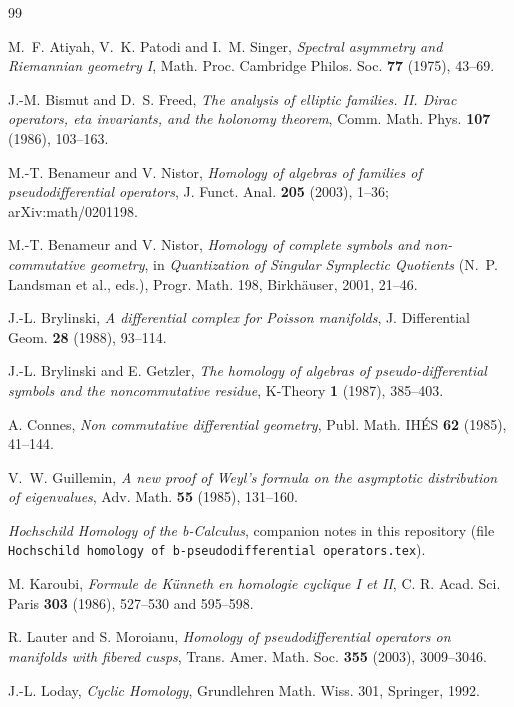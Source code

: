 \documentclass[11pt,oneside,reqno]{article}
\theoremstyle{plain}
\theoremstyle{definition}
\theoremstyle{remark}
\begin{document}
\begin{thebibliography}{99}

M.~F. Atiyah, V.~K. Patodi and I.~M. Singer,
\emph{Spectral asymmetry and Riemannian geometry I},
Math. Proc. Cambridge Philos. Soc. \textbf{77} (1975), 43--69.

J.-M. Bismut and D.~S. Freed,
\emph{The analysis of elliptic families. II. Dirac operators, eta
invariants, and the holonomy theorem},
Comm. Math. Phys. \textbf{107} (1986), 103--163.

M.-T. Benameur and V. Nistor,
\emph{Homology of algebras of families of pseudodifferential operators},
J. Funct. Anal. \textbf{205} (2003), 1--36; arXiv:math/0201198.

M.-T. Benameur and V. Nistor,
\emph{Homology of complete symbols and non-commutative geometry}, in
\emph{Quantization of Singular Symplectic Quotients} (N.~P. Landsman et
al., eds.), Progr. Math. 198, Birkh\"auser, 2001, 21--46.

J.-L. Brylinski,
\emph{A differential complex for Poisson manifolds},
J. Differential Geom. \textbf{28} (1988), 93--114.

J.-L. Brylinski and E. Getzler,
\emph{The homology of algebras of pseudo-differential symbols and the
noncommutative residue},
K-Theory \textbf{1} (1987), 385--403.

A. Connes,
\emph{Non commutative differential geometry},
Publ. Math. IH\'ES \textbf{62} (1985), 41--144.

V.~W. Guillemin,
\emph{A new proof of Weyl's formula on the asymptotic distribution of
eigenvalues},
Adv. Math. \textbf{55} (1985), 131--160.

\emph{Hochschild Homology of the b-Calculus}, companion notes in this
repository (file \texttt{Hochschild homology of b-pseudodifferential
operators.tex}).

M. Karoubi,
\emph{Formule de K\"unneth en homologie cyclique I et II},
C. R. Acad. Sci. Paris \textbf{303} (1986), 527--530 and 595--598.

R. Lauter and S. Moroianu,
\emph{Homology of pseudodifferential operators on manifolds with fibered
cusps},
Trans. Amer. Math. Soc. \textbf{355} (2003), 3009--3046.

J.-L. Loday,
\emph{Cyclic Homology},
Grundlehren Math. Wiss. 301, Springer, 1992.


\end{thebibliography}
\end{document}
